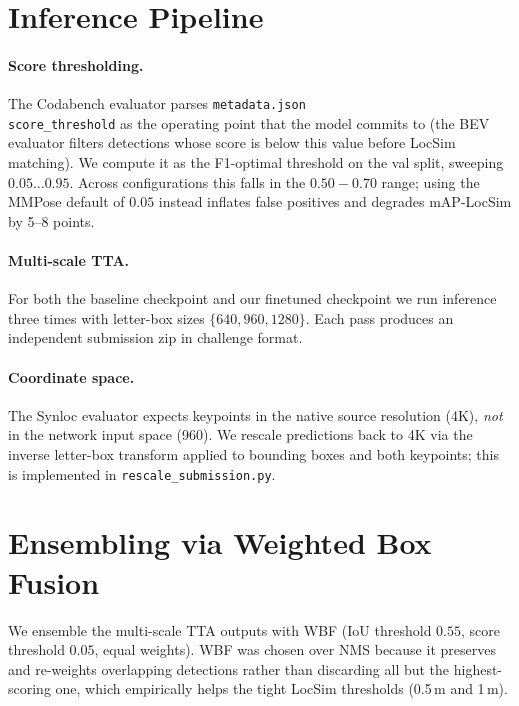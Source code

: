 \documentclass[10pt,twocolumn,letterpaper]{article}
\begin{document}
\section{Inference Pipeline}
\label{sec:inference}

\paragraph{Score thresholding.} The Codabench evaluator parses \texttt{metadata.json}\\\texttt{score\_threshold} as the operating point that the model commits to (the BEV evaluator filters detections whose score is below this value before LocSim matching). We compute it as the F1-optimal threshold on the val split, sweeping $0.05{\dots}0.95$. Across configurations this falls in the $0.50{-}0.70$ range; using the MMPose default of $0.05$ instead inflates false positives and degrades mAP-LocSim by 5--8 points.

\paragraph{Multi-scale TTA.} For both the baseline checkpoint and our finetuned checkpoint we run inference three times with letter-box sizes $\{640, 960, 1280\}$. Each pass produces an independent submission zip in challenge format.

\paragraph{Coordinate space.} The Synloc evaluator expects keypoints in the native source resolution (4K), \emph{not} in the network input space (960). We rescale predictions back to 4K via the inverse letter-box transform applied to bounding boxes and both keypoints; this is implemented in \texttt{rescale\_submission.py}.

\section{Ensembling via Weighted Box Fusion}
\label{sec:ensemble}

We ensemble the multi-scale TTA outputs with WBF (IoU threshold $0.55$, score threshold $0.05$, equal weights). WBF was chosen over NMS because it preserves and re-weights overlapping detections rather than discarding all but the highest-scoring one, which empirically helps the tight LocSim thresholds (0.5\,m and 1\,m).
\end{document}
